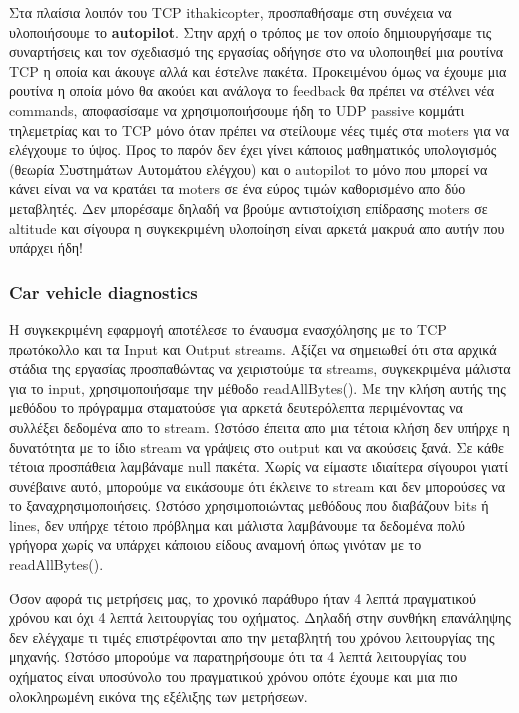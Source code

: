 \documentclass[hidelinks, 12pt, a4paper]{article}
\begin{document}
Στα πλαίσια λοιπόν του TCP ithakicopter, προσπαθήσαμε στη συνέχεια να υλοποιήσουμε το \textbf{autopilot}. Στην αρχή ο τρόπος με τον οποίο δημιουργήσαμε τις συναρτήσεις και τον σχεδιασμό της εργασίας οδήγησε στο να υλοποιηθεί μια ρουτίνα TCP η οποία και άκουγε αλλά και έστελνε πακέτα. Προκειμένου όμως να έχουμε μια ρουτίνα η οποία μόνο θα ακούει και ανάλογα το feedback θα πρέπει να στέλνει νέα commands, αποφασίσαμε να χρησιμοποιήσουμε ήδη το  UDP passive κομμάτι τηλεμετρίας και το TCP μόνο όταν πρέπει να στείλουμε νέες τιμές στα moters για να ελέγχουμε το ύψος. Προς το παρόν δεν έχει γίνει κάποιος μαθηματικός υπολογισμός (θεωρία Συστημάτων Αυτομάτου ελέγχου) και ο autopilot το μόνο που μπορεί να κάνει είναι να να κρατάει τα moters σε ένα εύρος τιμών καθορισμένο απο δύο μεταβλητές. Δεν μπορέσαμε δηλαδή να βρούμε αντιστοίχιση επίδρασης moters σε altitude και σίγουρα η συγκεκριμένη υλοποίηση είναι αρκετά μακρυά απο αυτήν που υπάρχει ήδη! 


\subsubsection{Car vehicle diagnostics}

Η συγκεκριμένη εφαρμογή αποτέλεσε το έναυσμα ενασχόλησης με το TCP πρωτόκολλο και τα Input και Output streams. Αξίζει να σημειωθεί ότι στα αρχικά στάδια της εργασίας προσπαθώντας να χειριστούμε τα streams, συγκεκριμένα μάλιστα για το input, χρησιμοποιήσαμε την μέθοδο readAllBytes(). Με την κλήση αυτής της μεθόδου το πρόγραμμα σταματούσε για αρκετά δευτερόλεπτα περιμένοντας να συλλέξει δεδομένα απο το stream. Ωστόσο έπειτα απο μια τέτοια κλήση δεν υπήρχε η δυνατότητα με το ίδιο stream να γράψεις στο output και να ακούσεις ξανά. Σε κάθε τέτοια προσπάθεια λαμβάναμε null πακέτα. Χωρίς να είμαστε ιδιαίτερα σίγουροι γιατί συνέβαινε αυτό, μπορούμε να εικάσουμε ότι έκλεινε το stream και δεν μπορούσες να το ξαναχρησιμοποιήσεις. Ωστόσο χρησιμοποιώντας μεθόδους που διαβάζουν bits ή lines, δεν υπήρχε τέτοιο πρόβλημα και μάλιστα λαμβάνουμε τα δεδομένα πολύ γρήγορα χωρίς να υπάρχει κάποιου είδους αναμονή όπως γινόταν με το readAllBytes().  

Όσον αφορά τις μετρήσεις μας, το χρονικό παράθυρο ήταν 4 λεπτά πραγματικού χρόνου και όχι 4 λεπτά λειτουργίας του οχήματος. Δηλαδή στην συνθήκη επανάληψης δεν ελέγχαμε τι τιμές επιστρέφονται απο την μεταβλητή του χρόνου λειτουργίας της μηχανής. Ωστόσο μπορούμε να παρατηρήσουμε ότι τα 4 λεπτά λειτουργίας του οχήματος είναι υποσύνολο του πραγματικού χρόνου οπότε έχουμε και μια πιο ολοκληρωμένη εικόνα της εξέλιξης των μετρήσεων. 
\end{document}
